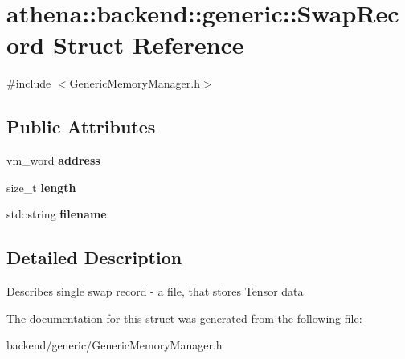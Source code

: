 \hypertarget{structathena_1_1backend_1_1generic_1_1_swap_record}{}\section{athena\+:\+:backend\+:\+:generic\+:\+:Swap\+Record Struct Reference}
\label{structathena_1_1backend_1_1generic_1_1_swap_record}


{\ttfamily \#include $<$Generic\+Memory\+Manager.\+h$>$}

\subsection*{Public Attributes}
\begin{DoxyCompactItemize}
\item 
\mbox{\label{structathena_1_1backend_1_1generic_1_1_swap_record_ac3ffe37973d1992220844a94c8b6afcb}} 
vm\+\_\+word {\bfseries address}
\item 
\mbox{\label{structathena_1_1backend_1_1generic_1_1_swap_record_ad4851011bc4d109f47c5610e817978de}} 
size\+\_\+t {\bfseries length}
\item 
\mbox{\label{structathena_1_1backend_1_1generic_1_1_swap_record_ae3f76aea814f0e9b0d6fabbfa349c54a}} 
std\+::string {\bfseries filename}
\end{DoxyCompactItemize}


\subsection{Detailed Description}
Describes single swap record -\/ a file, that stores Tensor data 

The documentation for this struct was generated from the following file\+:\begin{DoxyCompactItemize}
\item 
backend/generic/Generic\+Memory\+Manager.\+h\end{DoxyCompactItemize}
